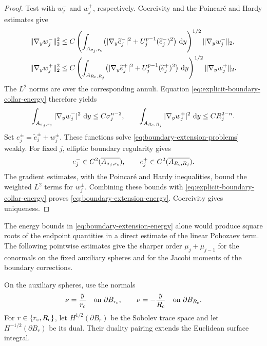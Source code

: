 \documentclass[11pt]{article}
\numberwithin{equation}{section}
\theoremstyle{remark}
\newcommand{\dd}{\mathop{}\!\mathrm{d}}
\begin{document}
\begin{proof}
Test with \(w_j^-\) and \(w_j^+\), respectively.
Coercivity and the Poincar\'e and Hardy estimates give
\[
 \begin{aligned}
 \|\nabla_yw_j^-\|_2^2
 &\le C\left(
 \int_{A_{\sigma_j,r_{\rm c}}}
 \bigl(|\nabla_y\widetilde e_j^-|^2
      +U_j^{p-1}(\widetilde e_j^-)^2\bigr)\,\dd y
 \right)^{1/2}\|\nabla_yw_j^-\|_2,\\
 \|\nabla_yw_j^+\|_2^2
 &\le C\left(
 \int_{A_{R_{\rm c},R_j}}
 \bigl(|\nabla_y\widetilde e_j^+|^2
      +U_j^{p-1}(\widetilde e_j^+)^2\bigr)\,\dd y
 \right)^{1/2}\|\nabla_yw_j^+\|_2.
 \end{aligned}
\]
The \(L^2\) norms are over the corresponding annuli.
Equation  \eqref{eq:explicit-boundary-collar-energy} therefore yields
\[
 \int_{A_{\sigma_j,r_{\rm c}}}|\nabla_yw_j^-|^2\,\dd y
 \le C\sigma_j^{n-2},\qquad
 \int_{A_{R_{\rm c},R_j}}|\nabla_yw_j^+|^2\,\dd y
 \le CR_j^{2-n}.
\]
Set \(e_j^\pm=\widetilde e_j^\pm+w_j^\pm\).
These functions solve \eqref{eq:boundary-extension-problems} weakly.
For fixed \(j\), elliptic boundary regularity gives
\[
 e_j^-\in C^2(\overline{A_{\sigma_j,r_{\rm c}}}),\qquad
 e_j^+\in C^2(\overline{A_{R_{\rm c},R_j}}).
\]
The gradient estimates, with the Poincar\'e and Hardy inequalities,
bound the weighted \(L^2\) terms for \(w_j^\pm\).
Combining these bounds with \eqref{eq:explicit-boundary-collar-energy}
proves \eqref{eq:boundary-extension-energy}. Coercivity gives uniqueness.
\end{proof}

\par
The energy bounds in \eqref{eq:boundary-extension-energy} alone would
produce square roots of the endpoint quantities in a direct estimate of
the linear Pohozaev term. The following pointwise estimates give the
sharper order \(\mu_j+\mu_{j-1}\) for the conormals on the fixed auxiliary
spheres and for the Jacobi moments of the boundary corrections.

On the auxiliary spheres, use the normals
\begin{equation}\label{eq:boundary-auxiliary-normals}
 \nu=\frac{y}{r_{\rm c}}\quad\text{on }\partial B_{r_{\rm c}},
 \qquad
 \nu=-\frac{y}{R_{\rm c}}\quad\text{on }\partial B_{R_{\rm c}}.
\end{equation}
For \(r\in\{r_{\rm c},R_{\rm c}\}\), let
\(H^{1/2}(\partial B_r)\) be the Sobolev trace space and let
\(H^{-1/2}(\partial B_r)\) be its dual. Their duality pairing extends the
Euclidean surface integral.
\end{document}

